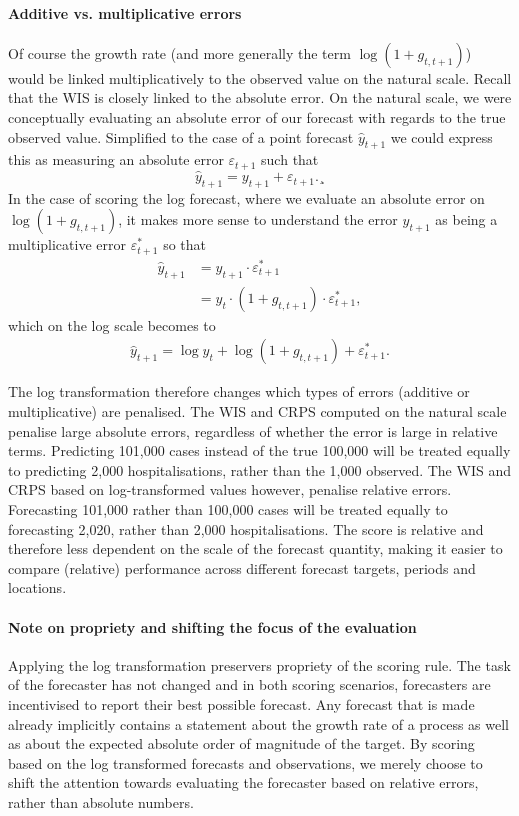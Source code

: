 \documentclass{article}
\begin{document}
\paragraph{Additive vs. multiplicative errors}
Of course the growth rate (and more generally the term $\log (1 + g_{t, t+1})$) would be linked multiplicatively to the observed value on the natural scale. Recall that the WIS is closely linked to the absolute error. On the natural scale, we were conceptually evaluating an absolute error of our forecast with regards to the true observed value. Simplified to the case of a point forecast $\hat{y}_{t+1}$ we could express this as measuring an absolute error $\varepsilon_{t+1}$ such that
%
\begin{equation}
    \hat{y}_{t+1} = y_{t+1} + \varepsilon_{t+1}. 
¸\end{equation}
In the case of scoring the log forecast, where we evaluate an absolute error on $\log (1 + g_{t, t+1})$, it makes more sense to understand the error $y_{t+1}$ as being a multiplicative error $\varepsilon^*_{t+1}$ so that
\begin{align}
    \hat{y}_{t+1} &= y_{t+1} \cdot \varepsilon^*_{t+1} \\
    &= y_{t} \cdot (1 + g_{t, t+1}) \cdot \varepsilon^*_{t+1},
\end{align}
%
which on the log scale becomes to 
\begin{align}
    \hat{y}_{t+1} = \log y_{t} + \log (1 + g_{t, t+1}) + \varepsilon^*_{t+1}. 
\end{align}

The log transformation therefore changes which types of errors (additive or multiplicative) are penalised. The WIS and CRPS computed on the natural scale penalise large absolute errors, regardless of whether the error is large in relative terms. Predicting 101,000 cases instead of the true 100,000 will be treated equally to predicting 2,000 hospitalisations, rather than the 1,000 observed. The WIS and CRPS based on log-transformed values however, penalise relative errors. Forecasting 101,000 rather than 100,000 cases will be treated equally to forecasting 2,020, rather than 2,000 hospitalisations. The score is relative and therefore less dependent on the scale of the forecast quantity, making it easier to compare (relative) performance across different forecast targets, periods and locations. 

\paragraph{Note on propriety and shifting the focus of the evaluation}
Applying the log transformation preservers propriety of the scoring rule. The task of the forecaster has not changed and in both scoring scenarios, forecasters are incentivised to report their best possible forecast. Any forecast that is made already implicitly contains a statement about the growth rate of a process as well as about the expected absolute order of magnitude of the target. By scoring based on the log transformed forecasts and observations, we merely choose to shift the attention towards evaluating the forecaster based on relative errors, rather than absolute numbers. 
\end{document}
